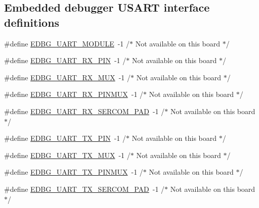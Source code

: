 \subsection*{Embedded debugger U\+S\+A\+RT interface definitions}
\begin{DoxyCompactItemize}
\item 
\#define \mbox{\hyperlink{group__samd21__xplained__pro__features__group_ga263caaf51dde2163dbdb1b5cdee1be4d}{E\+D\+B\+G\+\_\+\+U\+A\+R\+T\+\_\+\+M\+O\+D\+U\+LE}}~-\/1 /$\ast$ Not available on this board $\ast$/
\item 
\#define \mbox{\hyperlink{group__samd21__xplained__pro__features__group_ga12b6b3e177ffda8eda2169880637c0ef}{E\+D\+B\+G\+\_\+\+U\+A\+R\+T\+\_\+\+R\+X\+\_\+\+P\+IN}}~-\/1 /$\ast$ Not available on this board $\ast$/
\item 
\#define \mbox{\hyperlink{group__samd21__xplained__pro__features__group_ga5300e4deeffffeb36482893abfa91782}{E\+D\+B\+G\+\_\+\+U\+A\+R\+T\+\_\+\+R\+X\+\_\+\+M\+UX}}~-\/1 /$\ast$ Not available on this board $\ast$/
\item 
\#define \mbox{\hyperlink{group__samd21__xplained__pro__features__group_ga648907e5e1d95d0ca37a48bf487e31ee}{E\+D\+B\+G\+\_\+\+U\+A\+R\+T\+\_\+\+R\+X\+\_\+\+P\+I\+N\+M\+UX}}~-\/1 /$\ast$ Not available on this board $\ast$/
\item 
\#define \mbox{\hyperlink{group__samd21__xplained__pro__features__group_gaa79ab0c50211456414e397e05003ac17}{E\+D\+B\+G\+\_\+\+U\+A\+R\+T\+\_\+\+R\+X\+\_\+\+S\+E\+R\+C\+O\+M\+\_\+\+P\+AD}}~-\/1 /$\ast$ Not available on this board $\ast$/
\item 
\#define \mbox{\hyperlink{group__samd21__xplained__pro__features__group_ga870808eab672d6a51e18430979d8fb4f}{E\+D\+B\+G\+\_\+\+U\+A\+R\+T\+\_\+\+T\+X\+\_\+\+P\+IN}}~-\/1 /$\ast$ Not available on this board $\ast$/
\item 
\#define \mbox{\hyperlink{group__samd21__xplained__pro__features__group_ga36d751daa7473464d2b796ca99bddd46}{E\+D\+B\+G\+\_\+\+U\+A\+R\+T\+\_\+\+T\+X\+\_\+\+M\+UX}}~-\/1 /$\ast$ Not available on this board $\ast$/
\item 
\#define \mbox{\hyperlink{group__samd21__xplained__pro__features__group_gab0ec9f595b2de9a477d80cb619d35936}{E\+D\+B\+G\+\_\+\+U\+A\+R\+T\+\_\+\+T\+X\+\_\+\+P\+I\+N\+M\+UX}}~-\/1 /$\ast$ Not available on this board $\ast$/
\item 
\#define \mbox{\hyperlink{group__samd21__xplained__pro__features__group_ga5bb38a579c61a63d56c941de2ec21640}{E\+D\+B\+G\+\_\+\+U\+A\+R\+T\+\_\+\+T\+X\+\_\+\+S\+E\+R\+C\+O\+M\+\_\+\+P\+AD}}~-\/1 /$\ast$ Not available on this board $\ast$/
\end{DoxyCompactItemize}
